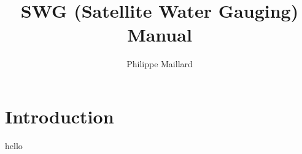 \documentclass[12pt,a4paper]{article}
\author{Philippe Maillard}
\title{\textbf{SWG (Satellite Water Gauging) Manual}}
\begin{document}
\maketitle
\section{Introduction}
hello
\end{document}
